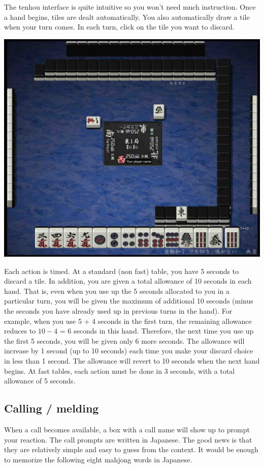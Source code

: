 The {\jap tenhou} interface is quite intuitive so you won't need much instruction. 
Once a hand begins, tiles are dealt automatically. You also automatically draw a tile when your turn comes. 
In each turn, click on the tile you want to discard. 

\begin{center}
\includegraphics[width=.6\textwidth,clip]{figs/interface.jpg}
\end{center}
\vspace{-25pt}

\bigskip
Each action is timed. At a standard (non fast) table, you have 5 seconds to discard a tile. In addition, you are given a total allowance of 10 seconds in each hand. That is, even when you use up the 5 seconds allocated to you in a particular turn, you will be given the maximum of additional 10 seconds (minus the seconds you have already used up in previous turns in the hand). For example, when you use 5 + 4 seconds in the first turn, the remaining allowance reduces to $10 - 4$ = 6 seconds in this hand. Therefore, the next time you use up the first 5 seconds, you will be given only 6 more seconds. The allowance will increase by 1 second (up to 10 seconds) each time you make your discard choice in less than 1 second. The allowance will revert to 10 seconds when the next hand begins. At fast tables, each action must be done in 3 seconds, with a total allowance of 5 seconds.

\subsection{Calling / melding}
When a call becomes available, a box with a call name will show up to prompt your reaction. 
The call prompts are written in Japanese. The good news is that they are relatively simple and easy to guess from the context. It would be enough to memorize the following eight mahjong words in Japanese. 

